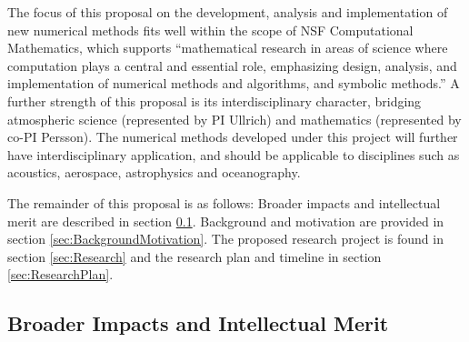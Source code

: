 \documentclass[11pt]{article}
\begin{document}
\vspace{-0.4cm}
The focus of this proposal on the development, analysis and implementation of new numerical methods fits well within the scope of NSF Computational Mathematics, which supports ``mathematical research in areas of science where computation plays a central and essential role, emphasizing design, analysis, and implementation of numerical methods and algorithms, and symbolic methods.''  A further strength of this proposal is its interdisciplinary character, bridging atmospheric science (represented by PI Ullrich) and mathematics (represented by co-PI Persson).  The numerical methods developed under this project will further have interdisciplinary application, and should be applicable to disciplines such as acoustics, aerospace, astrophysics and oceanography.

The remainder of this proposal is as follows:  Broader impacts and intellectual merit are described in section \ref{sec:BroaderImpacts}.  Background and motivation are provided in section \ref{sec:BackgroundMotivation}.  The proposed research project is found in section \ref{sec:Research} and the research plan and timeline in section \ref{sec:ResearchPlan}.

\subsection{Broader Impacts and Intellectual Merit} \label{sec:BroaderImpacts}
\end{document}
